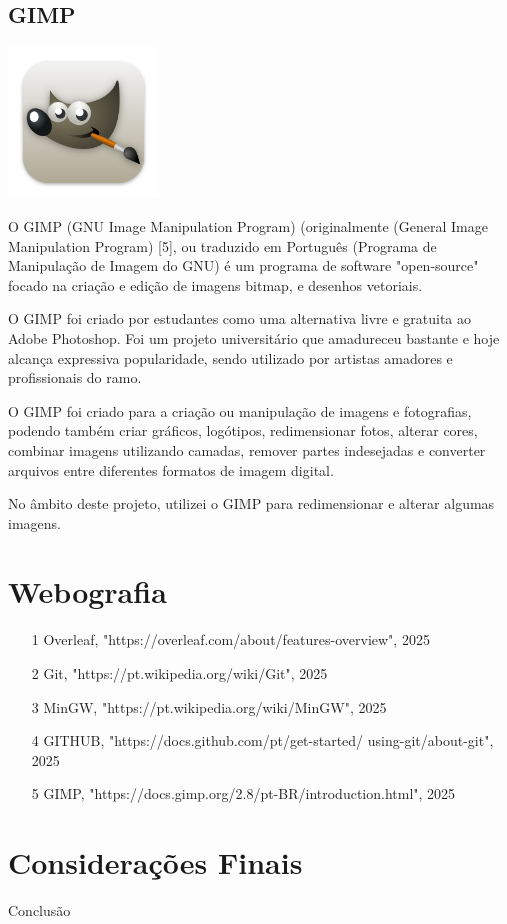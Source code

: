 \documentclass[a4paper,12pt]{article}
\begin{document}
\subsection{GIMP}
    \includegraphics[width=0.3\textwidth]{gimp.png} %
    \vspace{0.5cm}

O GIMP (GNU Image Manipulation Program) (originalmente (General Image Manipulation Program) [5], ou traduzido em Português (Programa de Manipulação de Imagem do GNU) é um programa de software "open-source" focado na criação e edição de imagens bitmap, e desenhos vetoriais.

O GIMP foi criado por estudantes como uma alternativa livre e gratuita ao Adobe Photoshop. Foi um projeto universitário que amadureceu bastante e hoje alcança expressiva popularidade, sendo utilizado por artistas amadores e profissionais do ramo.

O GIMP foi criado para a criação ou manipulação de imagens e fotografias, podendo também criar gráficos, logótipos, redimensionar fotos, alterar cores, combinar imagens utilizando camadas, remover partes indesejadas e converter arquivos entre diferentes formatos de imagem digital.

No âmbito deste projeto, utilizei o GIMP para redimensionar e alterar algumas imagens.

\section{Webografia}
\begin{itemize}
    \item [1] Overleaf, "https://overleaf.com/about/features-overview", 2025

    \item [2] Git, "https://pt.wikipedia.org/wiki/Git", 2025

    \item [3] MinGW, "https://pt.wikipedia.org/wiki/MinGW", 2025
    
    \item [4] GITHUB, "https://docs.github.com/pt/get-started/
    \newline
    using-git/about-git", 2025
    
    \item [5] GIMP, "https://docs.gimp.org/2.8/pt-BR/introduction.html", 2025
    
\end{itemize}

\section{Considerações Finais}

Conclusão
\end{document}
